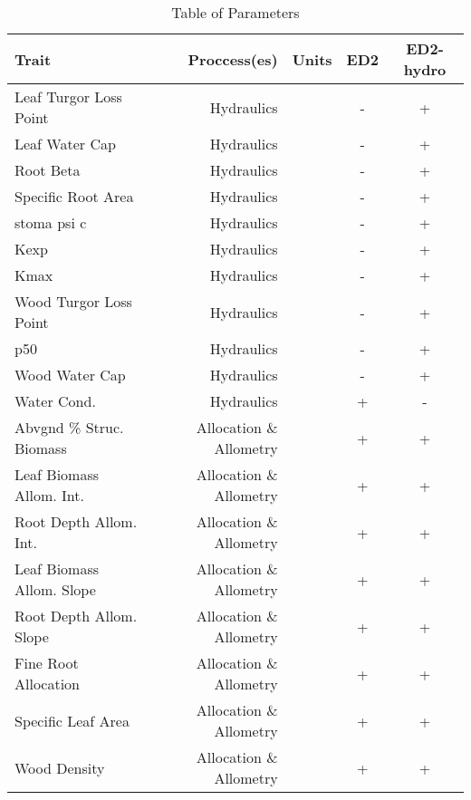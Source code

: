 
\begin{table}[!htp]
\centering
\caption[Parameters]{Table of Parameters}
\label{tab:params}
\scriptsize
\begin{tabular}{lrrcc}\toprule
Trait &Proccess(es) &Units &ED2 &ED2-hydro \\\midrule
Leaf Turgor Loss Point &Hydraulics & &- &+ \\
Leaf Water Cap &Hydraulics & &- &+ \\
Root Beta &Hydraulics & &- &+ \\
Specific Root Area &Hydraulics & &- &+ \\
stoma psi c &Hydraulics & &- &+ \\
Kexp &Hydraulics & &- &+ \\
Kmax &Hydraulics & &- &+ \\
Wood Turgor Loss Point &Hydraulics & &- &+ \\
p50 &Hydraulics & &- &+ \\
Wood Water Cap &Hydraulics & &- &+ \\
Water Cond. &Hydraulics & &+ &- \\
Abvgnd \% Struc. Biomass &Allocation \& Allometry & &+ &+ \\
Leaf Biomass Allom. Int. &Allocation \& Allometry & &+ &+ \\
Root Depth Allom. Int. &Allocation \& Allometry & &+ &+ \\
Leaf Biomass Allom. Slope &Allocation \& Allometry & &+ &+ \\
Root Depth Allom. Slope &Allocation \& Allometry & &+ &+ \\
Fine Root Allocation &Allocation \& Allometry & &+ &+ \\
Specific Leaf Area &Allocation \& Allometry & &+ &+ \\
Wood Density &Allocation \& Allometry & &+ &+ \\

\end{tabular}
\end{table}
